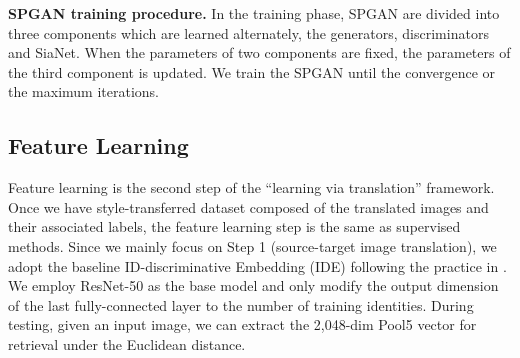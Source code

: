 \documentclass[10pt,twocolumn,letterpaper]{article}
\begin{document}
{\textbf{SPGAN training procedure.} In the training phase, SPGAN are divided into three components which are learned alternately, the generators, discriminators and SiaNet. When the parameters of two components are fixed, the parameters of the third component is updated. We train the SPGAN until the convergence or the maximum iterations. 

\subsection{Feature Learning}\label{sec:feature_learning}
Feature learning is the second step of the ``learning via translation'' framework. Once we have style-transferred dataset  composed of the translated images and their associated labels, the feature learning step is the same as supervised methods. Since we mainly focus on Step 1 (source-target image translation), we adopt the baseline ID-discriminative Embedding (IDE) following the practice in \cite{DBLP:journals/corr/ZhengYH16,zheng2017unlabeled,DBLP:conf/cvpr/ZhongZCL17}. We employ ResNet-50 \cite{DBLP:conf/cvpr/HeZRS16} as the base model and only modify the output dimension of the last fully-connected layer to the number of training identities. During testing, given an input image, we can extract the 2,048-dim Pool5 vector for retrieval under the Euclidean distance.

}
\end{document}
